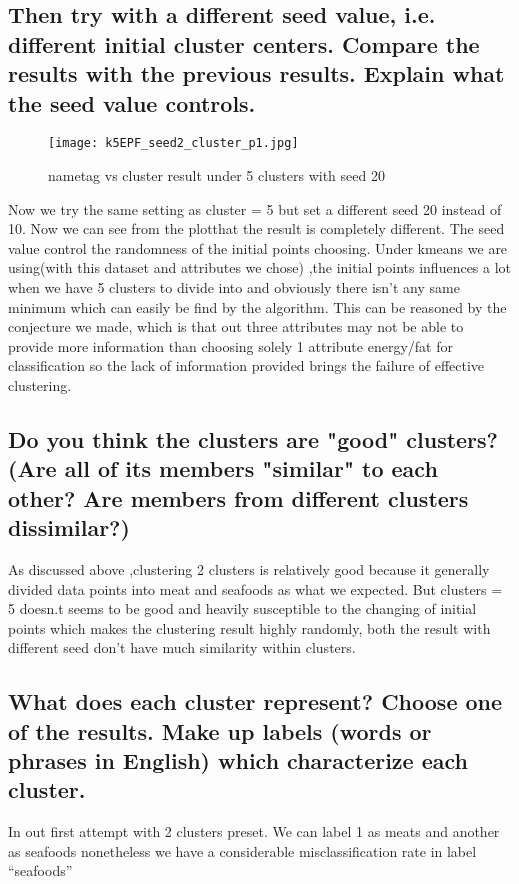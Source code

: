 \documentclass{article}
\begin{document}
\subsection{Then try with a different seed value, i.e. different initial cluster centers. Compare the results with the previous results. Explain what the seed value controls.}
\begin{figure}[H]
\centering
\texttt{[image: k5EPF\_seed2\_cluster\_p1.jpg]}
\caption{\label{fig:k5EPF_seed2_cluster_p1} nametag vs cluster result under 5 clusters with seed 20}
\end{figure}

Now we try the same setting as cluster = 5 but set a different seed 20 instead of 10. Now we can see from the plotthat the result is completely different. The seed value control the randomness of the initial points choosing. Under kmeans we are using(with this dataset and attributes we chose) ,the initial points influences a lot when we have 5 clusters to divide into and obviously there isn't any same minimum which can easily be find by the algorithm. This can be reasoned by the conjecture we made, which is that out three attributes may not be able to provide more information than choosing solely 1 attribute energy/fat for classification so the lack of information provided brings the failure of effective clustering.

\subsection{Do you think the clusters are "good" clusters? (Are all of its members "similar" to each other? Are members from different clusters dissimilar?)}

As discussed above ,clustering 2 clusters is relatively good because it generally divided data points into meat and seafoods as what we expected. But clusters = 5 doesn.t seems to be good and heavily susceptible to the changing of initial points which makes the clustering result highly randomly, both the result with different seed don't have much similarity within clusters.

\subsection{What does each cluster represent? Choose one of the results. Make up labels (words or phrases in English) which characterize each cluster.}

In out first attempt with 2 clusters preset. We can label 1 as meats and another as seafoods nonetheless we have a considerable misclassification rate in label “seafoods”
\end{document}
